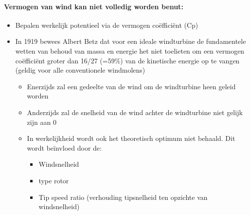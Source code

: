 \documentclass[12pt]{article}
\begin{document}
\paragraph{Vermogen van wind kan niet volledig worden benut:}
\begin{itemize}
    \item Bepalen werkelijk potentieel via de vermogen coëfficiënt (Cp)
    \item In 1919 bewees Albert Betz dat voor een ideale windturbine de fundamentele wetten van behoud van massa en energie het niet
    toelieten om een vermogen coëfficiënt groter dan 16/27 (=59\%) van de kinetische energie op te vangen (geldig voor alle conventionele windmolens)\begin{itemize}
        \item Enerzijds zal een gedeelte van de wind om de windturbine heen geleid worden 
        \item Anderzijds zal de snelheid van de wind achter de windturbine niet gelijk zijn aan 0
        \item In werkelijkheid wordt ook het theoretisch optimum niet
        behaald. Dit wordt beïnvloed door de:\begin{itemize}
            \item Windsnelheid
            \item type rotor
            \item Tip speed ratio (verhouding tipsnelheid ten opzichte van
            windsnelheid)
        \end{itemize}
    \end{itemize}
\end{itemize}
\end{document}
